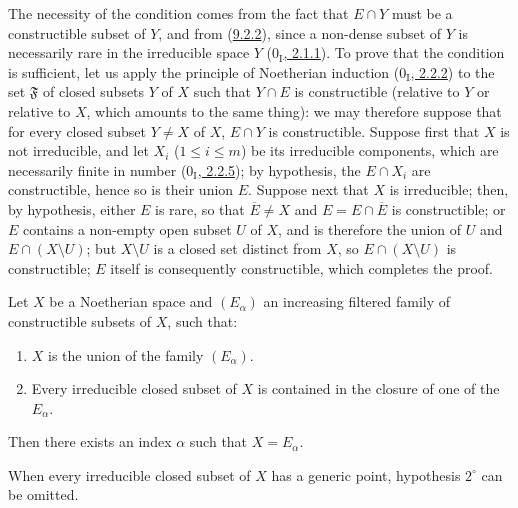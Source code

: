 The necessity of the condition comes from the fact that $E\cap Y$ must be a
constructible subset of $Y$, and from (\hyperref[0.9.2.2]{9.2.2}), since a
non-dense subset of $Y$ is necessarily rare in the irreducible space
$Y$ (\hyperref[0.2.1.1]{$0_{\mathrm I}$, 2.1.1}). To prove that the
condition is sufficient, let us apply the principle of Noetherian induction
(\hyperref[0.2.2.2]{$0_{\mathrm I}$, 2.2.2}) to the set
$\mathfrak{F}$ of closed subsets $Y$ of $X$ such that $Y\cap E$ is
constructible (relative to $Y$ or relative to $X$, which amounts to the
same thing): we may therefore suppose that for every closed subset $Y\ne X$
of $X$, $E\cap Y$ is constructible. Suppose first that $X$ is not
irreducible, and let $X_i$ ($1\leq i\leq m$) be its irreducible
components, which are necessarily finite in number
(\hyperref[0.2.2.5]{$0_{\mathrm I}$, 2.2.5}); by hypothesis, the
$E\cap X_i$ are constructible, hence so is their union $E$. Suppose
next that $X$ is irreducible; then, by hypothesis, either $E$ is
rare, so that $\overline{E}\ne X$ and $E=E\cap\overline{E}$ is constructible;
or $E$ contains a non-empty open subset $U$ of $X$, and is therefore the union
of $U$ and $E\cap(X\setminus U)$; but $X\setminus U$ is a closed set
distinct from $X$, so $E\cap(X\setminus U)$ is constructible; $E$
itself is consequently constructible, which completes the proof.

\begin{corollary}[9.2.4]
\label{0.9.2.4}
Let $X$ be a Noetherian space and $(E_\alpha)$ an increasing filtered
family of constructible subsets of $X$, such that:
\begin{enumerate}
  \item[$1^\circ$] $X$ is the union of the family $(E_\alpha)$.
  \item[$2^\circ$] Every irreducible closed subset of $X$ is contained in
    the closure of one of the $E_\alpha$.
\end{enumerate}
Then there exists an index $\alpha$ such that $X=E_\alpha$.

When every irreducible closed subset of $X$ has a generic point,
hypothesis $2^\circ$ can be omitted.
\end{corollary}


